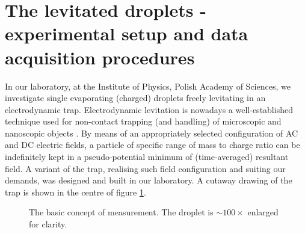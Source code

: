 \documentclass[preprint,review,12pt,dvips]{elsarticle}
\begin{document}
\section{The levitated droplets - experimental setup and data acquisition procedures}
In our laboratory, at the Institute of Physics, Polish Academy of Sciences, we investigate single evaporating (charged)
droplets freely levitating in an electrodynamic trap. Electrodynamic levitation is nowadays a well-established technique
used for non-contact trapping (and handling) of microscopic and nanoscopic objects \cite{Major}. By means of an
appropriately selected configuration of AC and DC electric fields, a particle of specific range of mass to charge ratio
can be indefinitely kept in a pseudo-potential minimum of (time-averaged) resultant field. A variant of the trap,
realising such field configuration and suiting our demands, was designed and built in our laboratory. A cutaway drawing of
the trap is shown in the centre of figure \ref{concept}.

\begin{figure}[h!t!b!]
\begin{center}
\end{center}
\caption{The basic concept of measurement. The droplet is $\sim 100\times$ enlarged for clarity.}\label{concept}
\end{figure}
\end{document}
